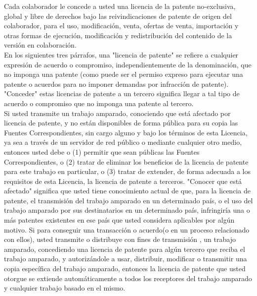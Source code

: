 \begin{enumerate}
		Cada colaborador le concede a usted una licencia de la patente no-exclusiva, global y libre de derechos bajo las reivindicaciones de patente de origen del colaborador, para el uso, modificación, venta, ofertas de venta, importación y otras formas de ejecución, modificación y redistribución del contenido de la versión en colaboración.\\
		
		En los siguientes tres párrafos, una "licencia de patente" se refiere a cualquier expresión de acuerdo o compromiso, independientemente de la denominación, que no imponga una patente (como puede ser el permiso expreso para ejecutar una patente o acuerdos para no imponer demandas por infracción de patente). "Conceder" estas licencias de patente a un tercero significa llegar a tal tipo de acuerdo o compromiso que no imponga una patente al tercero.\\
		
		Si usted transmite un trabajo amparado, conociendo que está afectado por licencia de patente, y no están disponibles de forma pública para su copia las Fuentes Correspondientes, sin cargo alguno y bajo los términos de esta Licencia, ya sea a través de un servidor de red público o mediante cualquier otro medio, entonces usted debe o (1) permitir que sean públicas las Fuentes Correspondientes, o (2) tratar de eliminar los beneficios de la licencia de patente para este trabajo en particular, o (3) tratar de extender, de forma adecuada a los requisitos de esta Licencia, la licencia de patente a terceros. "Conocer que está afectado" significa que usted tiene conocimiento actual de que, para la licencia de patente, el transmisión del trabajo amparado en un determinado país, o el uso del trabajo amparado por sus destinatarios en un determinado país, infringiría una o más patentes existentes en ese país que usted considera aplicables por algún motivo. Si para conseguir una transacción o acuerdo(o en un proceso relacionado con ellos), usted transmite o distribuye con fines de transmisión , un trabajo amparado, concediendo una licencia de patente para algún tercero que reciba el trabajo amparado, y autorizándole a usar, distribuir, modificar o transmitir una copia específica del trabajo amparado, entonces la licencia de patente que usted otorgue se extiende automáticamente a todos los receptores del trabajo amparado y cualquier trabajo basado en el mismo.\\
		

\end{enumerate}
